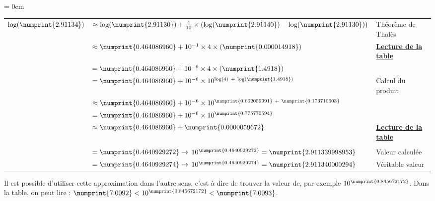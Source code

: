 \documentclass[a4paper, twoside]{article}
\begin{document}
	{\parindent = 0cm

	\begin{small}
	\begin{tabular}{cl|l}
	$\log (\numprint{2.91134}) $ & $\approx \log ( \numprint{2.91130} ) + \frac{4}{10} \times ( \log ( \numprint{2.91140} ) - \log ( \numprint{2.91130} ) )$ & Théorème de Thalès\\
								& $\approx \numprint{0.464 086 960} + 10^{-1} \times 4 \times (\numprint{0.000014 918} )$ & \underline{\textbf{Lecture de la table}}\\
								& $= \numprint{0.464 086 960} + 10^{-6} \times 4 \times ( \numprint{1.4 918} )$ &\\
								& $= \numprint{0.464 086 960} + 10^{-6} \times 10^{\log(4)~+~\log(\numprint{1.4 918})}$ & Calcul du produit\\
								& $\approx \numprint{0.464 086 960} + 10^{-6} \times 10^{\numprint{0.602 059 991}~+~\numprint{0.173 710 603}}$ &\\
								& $= \numprint{0.464 086 960} + 10^{-6} \times 10^{\numprint{0.775770594}}$ & \\
								& $\approx \numprint{0.464 086 960} + \numprint{0.000 005 967 2}$ & \underline{\textbf{Lecture de la table}}\\
								& & \\
								& $= \numprint{0.464 092 927 2} \rightarrow $ $10^{\numprint{0.464 092 927 2}} = \numprint{2.911 339 998 953}$ & Valeur calculée \\
								& $= \numprint{0.464 092 927 4} \rightarrow $ $10^{\numprint{0.464 092 927 4}} = \numprint{2.911 340 000 294}$  & Véritable valeur\\
	\end{tabular}
	\end{small}

	}

	\vspace{2 mm}

	Il est possible d'utiliser cette approximation dans l'autre sens, c'est à dire de trouver la valeur de, par exemple $10^{\numprint{0.845 672 172}}$. Dans la table, on peut lire : $\numprint{7.0092} <  10^{\numprint{0.845 672 172}} < \numprint{7.0093}$.

	\vspace{2 mm}
\end{document}
